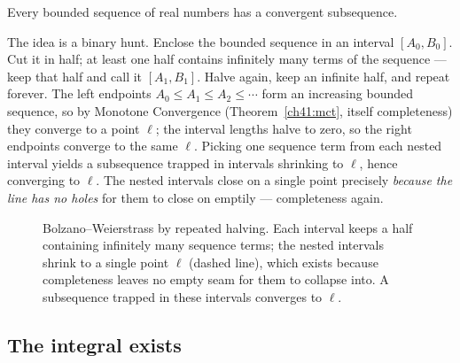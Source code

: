 \begin{theorem}
\label{ch41:bw}
Every bounded sequence of real numbers has a convergent subsequence.
\end{theorem}

The idea is a binary hunt. Enclose the bounded sequence in an interval $[A_0,B_0]$. Cut it
in half; at least one half contains infinitely many terms of the sequence --- keep that
half and call it $[A_1,B_1]$. Halve again, keep an infinite half, and repeat forever. The
left endpoints $A_0\le A_1\le A_2\le\cdots$ form an increasing bounded sequence, so by
Monotone Convergence (Theorem~\ref{ch41:mct}, itself completeness) they converge to a point
$\ell$; the interval lengths halve to zero, so the right endpoints converge to the same
$\ell$. Picking one sequence term from each nested interval yields a subsequence trapped in
intervals shrinking to $\ell$, hence converging to $\ell$. The nested intervals close on a
single point precisely \emph{because the line has no holes} for them to close on
emptily --- completeness again.

\begin{figure}[H]
\centering
{}
\caption{Bolzano--Weierstrass by repeated halving. Each interval keeps a half containing
infinitely many sequence terms; the nested intervals shrink to a single point $\ell$
(dashed line), which exists because completeness leaves no empty seam for them to collapse
into. A subsequence trapped in these intervals converges to $\ell$.}
\label{ch41:fig-bw}
\end{figure}

\subsection*{The integral exists}

